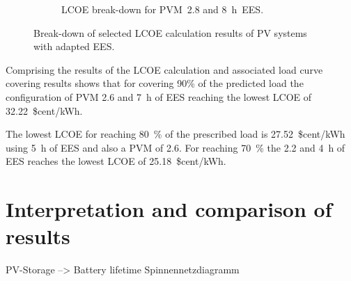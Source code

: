 \begin{figure}[!htbp]
\begin{subfigure}[b]{0.5\textwidth}
                \caption{LCOE break-down for PVM~2.8 and 8~h~EES.}\label{PV_LCOE_highinvest_BreakDown}
        \end{subfigure}
        \caption[Break-down of selected LCOE calculation  results of PV systems with adapted EES.]{Break-down of selected LCOE calculation results of PV systems with adapted EES.}\label{SMPV_LCOE_BreakDown}
\end{figure}
Comprising the results of the LCOE calculation and associated load curve covering results shows that for covering 90\% of the predicted load the configuration of PVM 2.6 and 7~h of EES reaching the lowest LCOE of 32.22~\$cent/kWh.

The lowest LCOE for reaching 80~\% of the prescribed load is 27.52~\$cent/kWh using 5~h of EES and also a PVM of 2.6. For reaching 70~\% the 2.2 and 4~h of EES reaches the lowest LCOE of 25.18~\$cent/kWh.
\pagebreak


\section{Interpretation and comparison of results}
PV-Storage --> Battery lifetime
Spinnennetzdiagramm 
